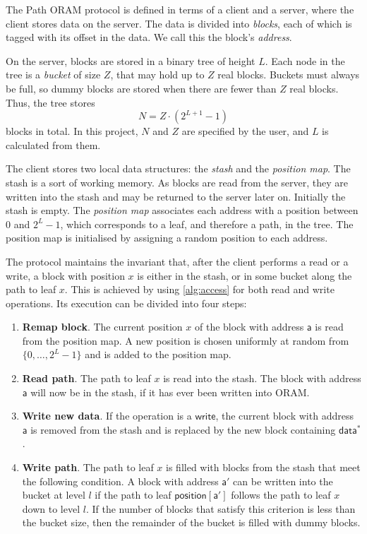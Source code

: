 \documentclass[12pt,a4paper,twoside,openright]{report}
\begin{document}
The Path ORAM protocol is defined in terms of a client and a server, where the client stores data on the server. The data is divided into \emph{blocks}, each of which is tagged with its offset in the data. We call this the block's \emph{address}.

On the server, blocks are stored in a binary tree of height $L$. Each node in the tree is a \emph{bucket} of size $Z$, that may hold up to $Z$ real blocks. Buckets must always be full, so dummy blocks are stored when there are fewer than $Z$ real blocks. Thus, the tree stores $$N = Z \cdot (2^{L+1} - 1)$$ blocks in total. In this project, $N$ and $Z$ are specified by the user, and $L$ is calculated from them.

The client stores two local data structures: the \emph{stash} and the \emph{position map}. The stash is a sort of working memory. As blocks are read from the server, they are written into the stash and may be returned to the server later on. Initially the stash is empty. The \emph{position map} associates each address with a position between $0$ and $2^L-1$, which corresponds to a leaf, and therefore a path, in the tree. The position map is initialised by assigning a random position to each address.

The protocol maintains the invariant that, after the client performs a read or a write, a block with position $x$ is either in the stash, or in some bucket along the path to leaf $x$. This is achieved by using \cref{alg:access} for both read and write operations. Its execution can be divided into four steps:

\begin{enumerate}
    \item \textbf{Remap block}. The current position $x$ of the block with address $\mathsf{a}$ is read from the position map. A new position is chosen uniformly at random from $\{0,\dots,2^L-1\}$ and is added to the position map.
    \item \textbf{Read path}. The path to leaf $x$ is read into the stash. The block with address $\mathsf{a}$ will now be in the stash, if it has ever been written into ORAM.
    \item \textbf{Write new data}. If the operation is a $\mathsf{write}$, the current block with address $\mathsf{a}$ is removed from the stash and is replaced by the new block containing $\mathsf{data^\ast}$.
    \item \textbf{Write path}. The path to leaf $x$ is filled with blocks from the stash that meet the following condition. A block with address $\mathsf{a'}$ can be written into the bucket at level $l$ if the path to leaf $\mathsf{position[a']}$ follows the path to leaf $x$ down to level $l$. If the number of blocks that satisfy this criterion is less than the bucket size, then the remainder of the bucket is filled with dummy blocks.
\end{enumerate}
\end{document}
